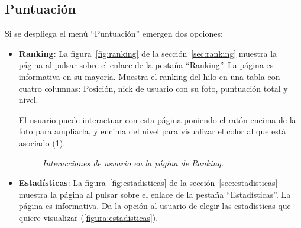 \documentclass[a4paper, 12pt]{book}
\begin{document}
\subsection{Puntuaci\'on}
Si se despliega el men\'u ``Puntuaci\'on'' emergen dos opciones:
\begin{itemize}
  \item {\bfseries Ranking}: La figura~\ref{fig:ranking} de la secci\'on~\ref{sec:ranking} muestra la p\'agina al pulsar sobre el enlace de la pesta\~na 
  ``Ranking''. La p\'agina es informativa en su mayor\'ia. Muestra el ranking del hilo en una tabla con cuatro columnas: Posici\'on, nick de usuario con su
  foto, puntuaci\'on total y nivel.
  
  El usuario puede interactuar con esta p\'agina poniendo el rat\'on encima de la foto para ampliarla, y encima del nivel para visualizar el color al que 
  est\'a asociado (\ref{figura:ranking}).
  \begin{figure}
    \centering
    \caption{\textit{Interacciones de usuario en la p\'agina de Ranking.}}
    \label{figura:ranking}
  \end{figure}
  \item {\bfseries Estad\'isticas}: La figura~\ref{fig:estadisticas} de la secci\'on~\ref{sec:estadisticas} muestra la p\'agina al pulsar sobre el enlace de la pesta\~na 
  ``Estad\'isticas''. La p\'agina es informativa. Da la opci\'on al usuario de elegir las estad\'isticas que quiere visualizar (\ref{figura:estadisticas}).
  

\end{itemize}
\end{document}
